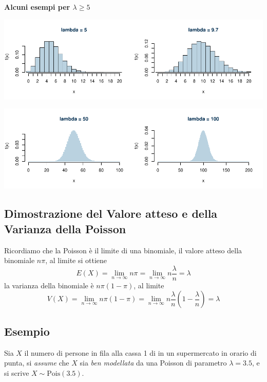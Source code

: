 \documentclass[
  11pt,
]{book}
\theoremstyle{mytheoremstyle}
\theoremstyle{mydefstyle}
\begin{document}
\textbf{Alcuni esempi per \(\lambda\geq 5\)}

\begin{center}\includegraphics{Appunti_di_Statistica_2025_files/figure-latex/07b-Poisson-3-1} \end{center}

\begin{center}\includegraphics{Appunti_di_Statistica_2025_files/figure-latex/07b-Poisson-4-1} \end{center}

\subsection{Dimostrazione del Valore atteso e della Varianza della Poisson}\label{dimostrazione-del-valore-atteso-e-della-varianza-della-poisson}

Ricordiamo che la Poisson è il limite di una binomiale, il valore atteso della binomiale \(n\pi\), al limite si ottiene
\[E(X)=\lim_{n\to\infty} n\pi=\lim_{n\to\infty} n\frac\lambda n=\lambda\]
la varianza della binomiale è \(n\pi(1-\pi)\), al limite
\[V(X)=\lim_{n\to\infty}n\pi(1-\pi)=\lim_{n\to\infty}n\frac\lambda n\left(1-\frac\lambda n\right)=\lambda\]

\subsection{Esempio}\label{esempio-1}

Sia \(X\) il numero di persone in fila alla cassa 1 di in un supermercato in orario di punta, si \emph{assume} che \(X\) sia \emph{ben modellata} da una Poisson di parametro \(\lambda=3.5\), e si scrive \(X\sim\text{Pois}(3.5)\).
\end{document}

